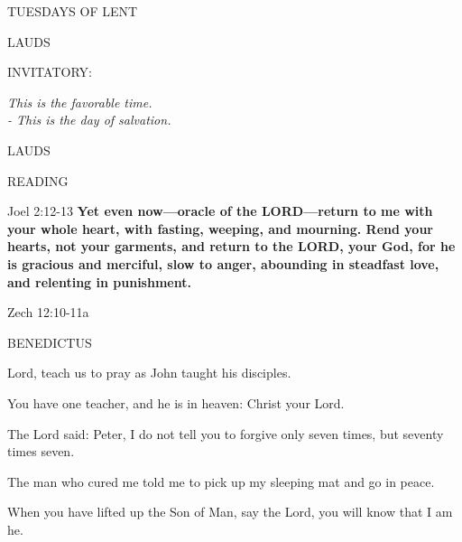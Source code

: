 \begin{center}
\normalsize TUESDAYS OF LENT
\end{center}

\begin{flushleft}\normalsize{\uppercase{LAUDS\\}}\end{flushleft}
\small{\uppercase{INVITATORY:}}\normalsize
\begin{center}
\textit{This is the favorable time.\\}
\textit{- This is the day of salvation.\\}
\end{center}
\begin{flushleft}\normalsize{\uppercase{LAUDS\\}}\end{flushleft}
\noindent\small READING
\begin{description}[labelindent=\parindent, leftmargin=*]
\item [Weeks 1-4:]     Joel 2:12-13 \textbf{    Yet even now—oracle of the LORD—return to me with your whole heart, with fasting, weeping, and mourning. Rend your hearts, not your garments, and return to the LORD, your God, for he is gracious and merciful, slow to anger, abounding in steadfast love, and relenting in punishment.\\}
\item [Week 5:]    Zech 12:10-11a   \textbf{} 
\end{description}

\noindent\small BENEDICTUS
\begin{description}[labelindent=\parindent, leftmargin=*]
\item [Week 1:] 	Lord, teach us to pray as John taught his disciples.
\item [Week 2:] 	You have one teacher, and he is in heaven: Christ your Lord.
\item [Week 3:] 	The Lord said: Peter, I do not tell you to forgive only seven times, but seventy times seven.
\item [Week 4:] 	The man who cured me told me to pick up my sleeping mat and go in peace.
\item [Week 5:] 	When you have lifted up the Son of Man, say the Lord, you will know that I am he.
\end{description}

